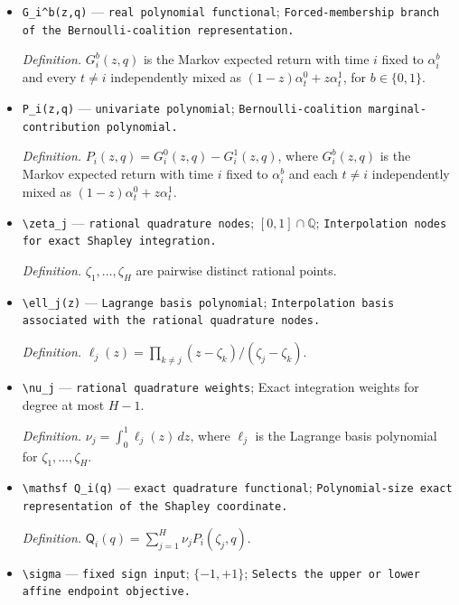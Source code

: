\documentclass{article}
\begin{document}
\begin{itemize}
  \item \texttt{G\_\allowbreak{}i\textasciicircum{}b(z,\allowbreak{}q)} --- \texttt{real polynomial functional}; \texttt{Forced-\allowbreak{}membership branch of the Bernoulli-\allowbreak{}coalition representation.}
  \par\smallskip\noindent\emph{Definition.} \(G_i^b(z,q)\) is the Markov expected return with time \(i\) fixed to \(\alpha_i^b\) and every \(t\ne i\) independently mixed as \((1-z)\alpha_t^0+z\alpha_t^1\), for \(b\in\{0,1\}\).
  \item \texttt{P\_\allowbreak{}i(z,\allowbreak{}q)} --- \texttt{univariate polynomial}; \texttt{Bernoulli-\allowbreak{}coalition marginal-\allowbreak{}contribution polynomial.}
  \par\smallskip\noindent\emph{Definition.} \(P_i(z,q)=G_i^0(z,q)-G_i^1(z,q)\), where \(G_i^b(z,q)\) is the Markov expected return with time \(i\) fixed to \(\alpha_i^b\) and each \(t\ne i\) independently mixed as \((1-z)\alpha_t^0+z\alpha_t^1\).
  \item \texttt{\textbackslash{}\allowbreak{}zeta\_\allowbreak{}j} --- \texttt{rational quadrature nodes}; \([0,1]\cap\mathbb Q\); \texttt{Interpolation nodes for exact Shapley integration.}
  \par\smallskip\noindent\emph{Definition.} \(\zeta_1,\ldots,\zeta_H\) are pairwise distinct rational points.
  \item \texttt{\textbackslash{}\allowbreak{}ell\_\allowbreak{}j(z)} --- \texttt{Lagrange basis polynomial}; \texttt{Interpolation basis associated with the rational quadrature nodes.}
  \par\smallskip\noindent\emph{Definition.} \(\ell_j(z)=\prod_{k\ne j}(z-\zeta_k)/(\zeta_j-\zeta_k)\).
  \item \texttt{\textbackslash{}\allowbreak{}nu\_\allowbreak{}j} --- \texttt{rational quadrature weights}; Exact integration weights for degree at most \(H-1\).
  \par\smallskip\noindent\emph{Definition.} \(\nu_j=\int_0^1\ell_j(z)\,dz\), where \(\ell_j\) is the Lagrange basis polynomial for \(\zeta_1,\ldots,\zeta_H\).
  \item \texttt{\textbackslash{}\allowbreak{}mathsf Q\_\allowbreak{}i(q)} --- \texttt{exact quadrature functional}; \texttt{Polynomial-\allowbreak{}size exact representation of the Shapley coordinate.}
  \par\smallskip\noindent\emph{Definition.} \(\mathsf Q_i(q)=\sum_{j=1}^H\nu_jP_i(\zeta_j,q)\).
  \item \texttt{\textbackslash{}\allowbreak{}sigma} --- \texttt{fixed sign input}; \(\{-1,+1\}\); \texttt{Selects the upper or lower affine endpoint objective.}

\end{itemize}
\end{document}
